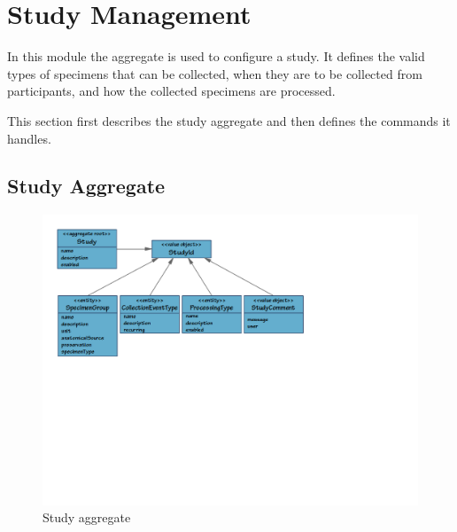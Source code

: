 \chapter{Study Management}

 In this module the  aggregate is used to configure a
 study. It defines the valid types of specimens that can be collected, when
 they are to be collected from participants, and how the collected specimens
 are processed.

 This section first describes the study aggregate and then defines the commands
 it handles.

\section{Study Aggregate}

\begin{figure}[h]
  \includegraphics[trim={9mm 104mm 80mm 9mm}, clip,
    width=1\textwidth]{images/study-aggregate}
  \caption{Study aggregate}
  \label{fig:study-aggregate}
\end{figure}

